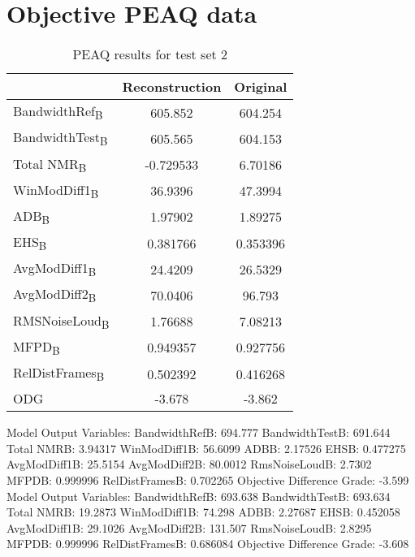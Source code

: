 \chapter{Objective PEAQ data}



\begin{table}\begin{center} %
\caption{PEAQ results for test set 2}
\label{tab:PEAQdata3}
\begin{tabular}{|l|c|c|}
  \hline
                                    & Reconstruction & Original \\ \hline
  BandwidthRef\textsubscript{B}     & 605.852        & 604.254\\
  BandwidthTest\textsubscript{B}    & 605.565        & 604.153\\
  Total NMR\textsubscript{B}        & -0.729533      & 6.70186\\
  WinModDiff1\textsubscript{B}      & 36.9396        & 47.3994\\
  ADB\textsubscript{B}              & 1.97902        & 1.89275\\
  EHS\textsubscript{B}              & 0.381766       & 0.353396\\
  AvgModDiff1\textsubscript{B}      & 24.4209        & 26.5329\\
  AvgModDiff2\textsubscript{B}      & 70.0406        & 96.793\\
  RMSNoiseLoud\textsubscript{B}     & 1.76688        & 7.08213\\
  MFPD\textsubscript{B}             & 0.949357       & 0.927756\\
  RelDistFrames\textsubscript{B}    & 0.502392       & 0.416268\\
  ODG                               & -3.678         & -3.862\\
  \hline
\end{tabular}
\end{center}\end{table}

Model Output Variables:
   BandwidthRefB: 694.777
  BandwidthTestB: 691.644
      Total NMRB: 3.94317
    WinModDiff1B: 56.6099
            ADBB: 2.17526
            EHSB: 0.477275
    AvgModDiff1B: 25.5154
    AvgModDiff2B: 80.0012
   RmsNoiseLoudB: 2.7302
           MFPDB: 0.999996
  RelDistFramesB: 0.702265
Objective Difference Grade: -3.599
Model Output Variables:
   BandwidthRefB: 693.638
  BandwidthTestB: 693.634
      Total NMRB: 19.2873
    WinModDiff1B: 74.298
            ADBB: 2.27687
            EHSB: 0.452058
    AvgModDiff1B: 29.1026
    AvgModDiff2B: 131.507
   RmsNoiseLoudB: 2.8295
           MFPDB: 0.999996
  RelDistFramesB: 0.686084
Objective Difference Grade: -3.608

